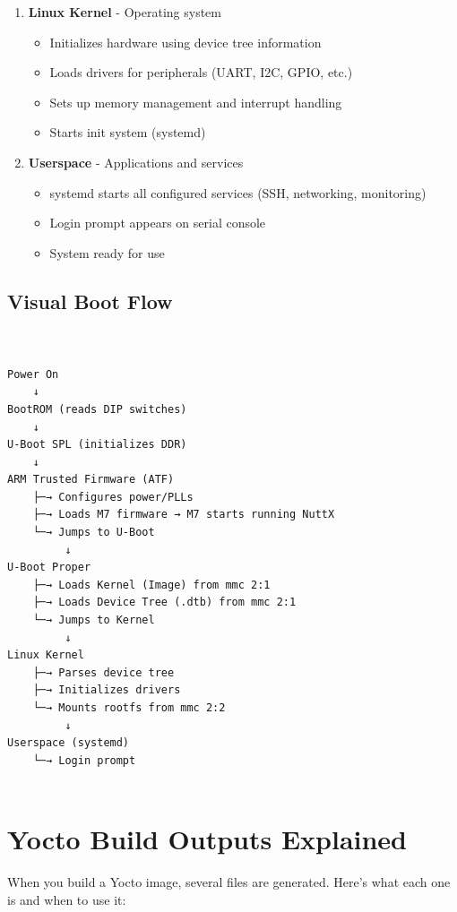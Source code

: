\documentclass[12pt,a4paper]{report}
\begin{document}
\begin{enumerate}
    \item \textbf{Linux Kernel} - Operating system
    \begin{itemize}
        \item Initializes hardware using device tree information
        \item Loads drivers for peripherals (UART, I2C, GPIO, etc.)
        \item Sets up memory management and interrupt handling
        \item Starts init system (systemd)
    \end{itemize}
    
    \item \textbf{Userspace} - Applications and services
    \begin{itemize}
        \item systemd starts all configured services (SSH, networking, monitoring)
        \item Login prompt appears on serial console
        \item System ready for use
    \end{itemize}
\end{enumerate}
\pagebreak
\subsection{Visual Boot Flow}

\begin{verbatim}
    

Power On
    ↓
BootROM (reads DIP switches)
    ↓
U-Boot SPL (initializes DDR)
    ↓
ARM Trusted Firmware (ATF)
    ├─→ Configures power/PLLs
    ├─→ Loads M7 firmware → M7 starts running NuttX
    └─→ Jumps to U-Boot
         ↓
U-Boot Proper
    ├─→ Loads Kernel (Image) from mmc 2:1
    ├─→ Loads Device Tree (.dtb) from mmc 2:1
    └─→ Jumps to Kernel
         ↓
Linux Kernel
    ├─→ Parses device tree
    ├─→ Initializes drivers
    └─→ Mounts rootfs from mmc 2:2
         ↓
Userspace (systemd)
    └─→ Login prompt
    
\end{verbatim}


\section{Yocto Build Outputs Explained}

When you build a Yocto image, several files are generated. Here's what each one is and when to use it:
\end{document}
